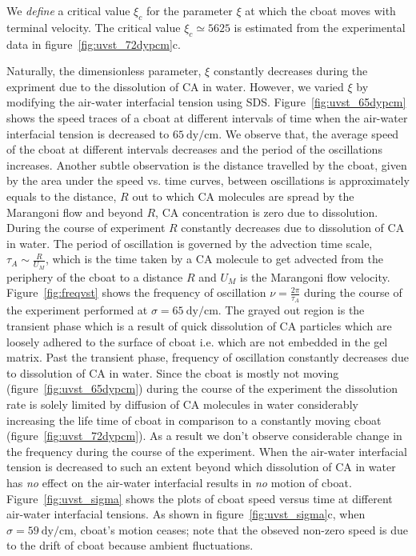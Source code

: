 \documentclass[journal=langd5, manuscript=article, layout=twocolumn]{achemso}
\begin{document}
We \emph{define} a critical value $\xi_{c}$ for the parameter $\xi$ at which the cboat moves with terminal velocity. The critical value $\xi_{c} \simeq 5625$ is estimated from the experimental data in figure~\ref{fig:uvst_72dypcm}c. \par
Naturally, the dimensionless parameter, $\xi$ constantly decreases during the expriment due to the dissolution of CA in water. However, we varied $\xi$ by modifying the air-water interfacial tension using SDS. Figure~\ref{fig:uvst_65dypcm} shows the speed traces of a cboat at different intervals of time when the air-water interfacial tension is decreased to $65\ \mathrm{dy/cm}$. We observe that, the average speed of the cboat at different intervals decreases and the period of the oscillations increases. Another subtle observation is the distance travelled by the cboat, given by the area under the speed vs. time curves, between oscillations is approximately equals to the distance, $R$ out to which CA molecules are spread by the Marangoni flow and beyond $R$, CA concentration is zero due to dissolution. During the course of experiment $R$ constantly decreases due to dissolution of CA in water. The period of oscillation is governed by the advection time scale, $\tau_{A} \sim \frac{R}{U_{M}}$, which is the time taken by a CA molecule to get advected from the periphery of the cboat to a distance $R$ and $U_{M}$ is the Marangoni flow velocity. Figure~\ref{fig:freqvst} shows the frequency of oscillation $\nu = \frac{2\pi}{\tau_{A}}$ during the course of the experiment performed at $\sigma = 65\ \mathrm{dy/cm}$. The grayed out region is the transient phase which is a result of quick dissolution of CA particles which are loosely adhered to the surface of cboat i.e. which are not embedded in the gel matrix. Past the transient phase, frequency of oscillation constantly decreases due to dissolution of CA in water. Since the cboat is mostly not moving (figure~\ref{fig:uvst_65dypcm}) during the course of the experiment the dissolution rate is solely limited by diffusion of CA molecules in water considerably increasing the life time of cboat in comparison to a constantly moving cboat (figure~\ref{fig:uvst_72dypcm}). As a result we don't observe considerable change in the frequency during the course of the experiment. When the air-water interfacial tension is decreased to such an extent beyond which dissolution of CA in water has \emph{no} effect on the air-water interfacial results in \emph{no} motion of cboat. Figure~\ref{fig:uvst_sigma} shows the plots of cboat speed versus time at different air-water interfacial tensions. As shown in figure~\ref{fig:uvst_sigma}c, when $\sigma = 59\ \mathrm{dy/cm}$, cboat's motion ceases; note that the obseved non-zero speed is due to the drift of cboat because ambient fluctuations.   
\end{document}
